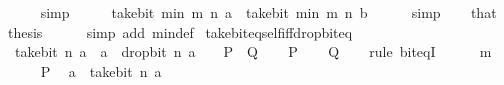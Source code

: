 \begin{isabellebody}
\ \ \ \ \isamarkupfalse%
\ simp\isanewline
\ \ \isamarkupfalse%
\ \isamarkupfalse%
\ {\isacartoucheopen}take{\isacharunderscore}{\kern0pt}bit\ {\isacharparenleft}{\kern0pt}min\ m\ n{\isacharparenright}{\kern0pt}\ a\ {\isacharequal}{\kern0pt}\ take{\isacharunderscore}{\kern0pt}bit\ {\isacharparenleft}{\kern0pt}min\ m\ n{\isacharparenright}{\kern0pt}\ b{\isacartoucheclose}\isanewline
\ \ \ \ \isamarkupfalse%
\ simp\isanewline
\ \ \isamarkupfalse%
\ that\ \isamarkupfalse%
\ {\isacharquery}{\kern0pt}thesis\isanewline
\ \ \ \ \isamarkupfalse%
\ {\isacharparenleft}{\kern0pt}simp\ add{\isacharcolon}{\kern0pt}\ min{\isacharunderscore}{\kern0pt}def{\isacharparenright}{\kern0pt}\isanewline
{}\isamarkupfalse%
%
\endisatagproof
{\isafoldproof}%
%
\isadelimproof
\isanewline
%
\endisadelimproof
\isanewline
{}\isamarkupfalse%
\ take{\isacharunderscore}{\kern0pt}bit{\isacharunderscore}{\kern0pt}eq{\isacharunderscore}{\kern0pt}self{\isacharunderscore}{\kern0pt}iff{\isacharunderscore}{\kern0pt}drop{\isacharunderscore}{\kern0pt}bit{\isacharunderscore}{\kern0pt}eq{\isacharunderscore}{\kern0pt}{}{\isacharcolon}{\kern0pt}\isanewline
\ \ {\isacartoucheopen}take{\isacharunderscore}{\kern0pt}bit\ n\ a\ {\isacharequal}{\kern0pt}\ a\ {\isasymlongleftrightarrow}\ drop{\isacharunderscore}{\kern0pt}bit\ n\ a\ {\isacharequal}{\kern0pt}\ {}{\isacartoucheclose}\ {\isacharparenleft}{\kern0pt}\ {\isacartoucheopen}{\isacharquery}{\kern0pt}P\ {\isasymlongleftrightarrow}\ {\isacharquery}{\kern0pt}Q{\isacartoucheclose}{\isacharparenright}{\kern0pt}\isanewline
%
\isadelimproof
%
\endisadelimproof
%
\isatagproof
{}\isamarkupfalse%
\isanewline
\ \ \isamarkupfalse%
\ {\isacharquery}{\kern0pt}P\isanewline
\ \ \isamarkupfalse%
\ {\isacharquery}{\kern0pt}Q\isanewline
\ \ \isamarkupfalse%
\ {\isacharparenleft}{\kern0pt}rule\ bit{\isacharunderscore}{\kern0pt}eqI{\isacharparenright}{\kern0pt}\isanewline
\ \ \ \ \isamarkupfalse%
\ m\isanewline
\ \ \ \ \isamarkupfalse%
\ {\isacartoucheopen}{\isacharquery}{\kern0pt}P{\isacartoucheclose}\ \isamarkupfalse%
\ {\isacartoucheopen}a\ {\isacharequal}{\kern0pt}\ take{\isacharunderscore}{\kern0pt}bit\ n\ a{\isacartoucheclose}\ \isacommand{{\isachardot}{\kern0pt}{\isachardot}{\kern0pt}}\isamarkupfalse%
\isanewline
\ \ \ \ \isamarkupfalse%
\ \isamarkupfalse%

\end{isabellebody}
